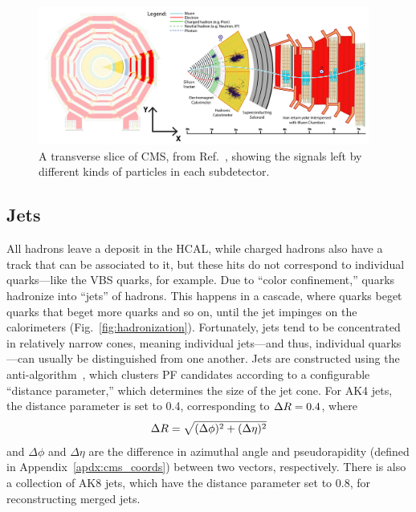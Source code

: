 \begin{figure}[htb]
    \centering
    \includegraphics[width=0.97\textwidth]{fig/cms/particle_id_slice.pdf}
    \caption[A transverse slice of CMS, showing the signals left by different kinds of particles in each subdetector.]{
        A transverse slice of CMS, from Ref.~\cite{Davis:2205172}, showing the signals left by different kinds of particles in each subdetector.
    }
    \label{fig:cms_particle_id}
\end{figure}

\subsection{Jets}
All hadrons leave a deposit in the HCAL, while charged hadrons also have a track that can be associated to it, but these hits do not correspond to individual quarks---like the VBS quarks, for example. 
Due to ``color confinement,'' quarks hadronize into ``jets'' of hadrons. 
This happens in a cascade, where quarks beget quarks that beget more quarks and so on, until the jet impinges on the calorimeters (Fig.~\ref{fig:hadronization}). 
Fortunately, jets tend to be concentrated in relatively narrow cones, meaning individual jets---and thus, individual quarks---can usually be distinguished from one another. 
Jets are constructed using the anti-\kt algorithm~\cite{Cacciari:2008gp, Cacciari:2011ma}, which clusters PF candidates according to a configurable ``distance parameter,'' which determines the size of the jet cone. 
For AK4 jets, the distance parameter is set to 0.4, corresponding to $\Delta R = 0.4$, where
\begin{equation}
    \Delta R = \sqrt{(\Delta\phi)^2 + (\Delta\eta)^2}
\end{equation}
and $\Delta\phi$ and $\Delta\eta$ are the difference in azimuthal angle and pseudorapidity (defined in Appendix~\ref{apdx:cms_coords}) between two vectors, respectively. 
There is also a collection of AK8 jets, which have the distance parameter set to 0.8, for reconstructing merged jets.

